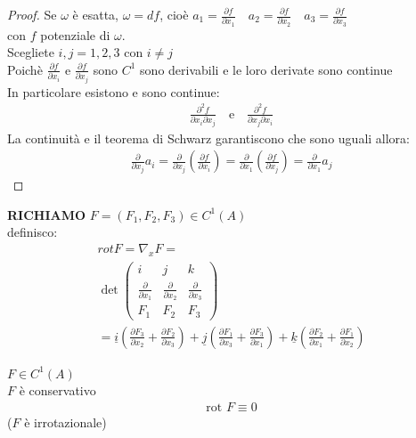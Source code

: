 \documentclass[a4paper, oneside]{article}
\begin{document}
\begin{proof}
    Se $\omega$ è esatta, $\omega = df$, cioè $a_1 = \frac{\partial f}{\partial x_1} \quad a_2 = \frac{\partial f}{\partial x_2} \quad a_3 = \frac{\partial f}{\partial x_3}   $\\
    con $f$ potenziale di $\omega$.\\
    Scegliete $i,j = 1,2,3$ con $i \neq j$\\
    Poichè $\frac{\partial f}{\partial x_i}$ e $\frac{\partial f}{\partial x_j}$ sono $C^1$ sono derivabili e le loro derivate sono continue\\
    In particolare esistono e sono continue:
    \begin{gather*}
        \frac{\partial^2 f}{\partial x_i\partial x_j} \quad \text{e} \quad \frac{\partial^2 f}{\partial x_j\partial x_i} 
    \end{gather*}
    La continuità e il teorema di Schwarz garantiscono che sono uguali allora:
    \begin{gather*}
        \frac{\partial}{\partial x_j} a_i = \frac{\partial}{\partial x_j} (\frac{\partial f}{\partial x_i}) = \frac{\partial}{\partial x_1}(\frac{\partial f}{\partial x_j}) = \frac{\partial}{\partial x_1} a_j
    \end{gather*}
\end{proof}
\noindent
\textbf{RICHIAMO} $F=(F_1,F_2,F_3) \in C^1(A)$\\
definisco:
\begin{gather*}
    rot F = \nabla_x F =\\
    \det\begin{pmatrix}
        i & j & k\\
        \frac{\partial}{\partial x_1} & \frac{\partial}{\partial x_2} & \frac{\partial}{\partial x_3}\\
        F_1 & F_2 & F_3
    \end{pmatrix}\\
    = \underline{i} (\frac{\partial F_3}{\partial x_2} + \frac{\partial F_2}{\partial x_3}) + \underline{j} (\frac{\partial F_1}{\partial x_3} + \frac{\partial F_3}{\partial x_1}) + \underline{k} (\frac{\partial F_2}{\partial x_1} + \frac{\partial F_1}{\partial x_2})
\end{gather*}
\begin{theorem}
     $F \in C^1(A)$\\
     $F$ è conservativo \\
    \begin{gather*}
        \text{rot } F \equiv 0
    \end{gather*}
    ($F$ è irrotazionale)
\end{theorem}
\end{document}
